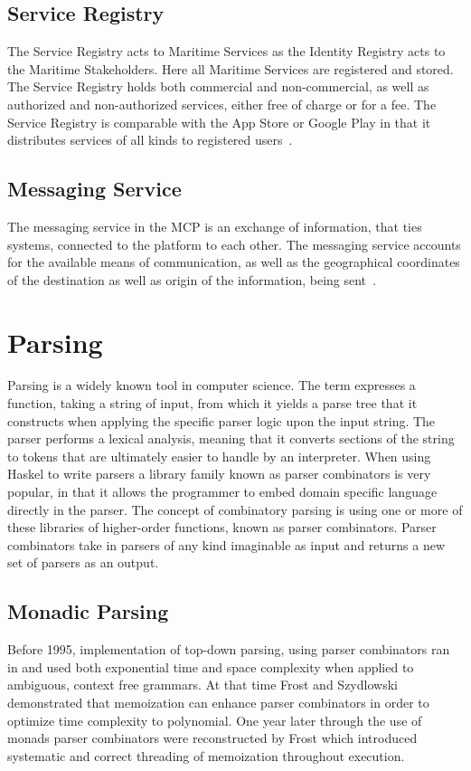 \subsection{Service Registry}
The Service Registry acts to Maritime Services as the Identity Registry acts to the Maritime Stakeholders. Here all Maritime Services are registered and stored. The Service Registry holds both commercial and non-commercial, as well as authorized and non-authorized services, either free of charge or for a fee. The Service Registry is comparable with the App Store or Google Play in that it distributes services of all kinds to registered users~\cite{efficienSea2}.
\subsection{Messaging Service}
The messaging service in the MCP is an exchange of information, that ties systems, connected to the platform to each other. The messaging service accounts for the available means of communication, as well as the geographical coordinates of the destination as well as origin of the information, being sent~\cite{efficienSea2}.

\section{Parsing}
Parsing is a widely known tool in computer science. The term expresses a function, taking a string of input, from which it yields a parse tree that it constructs when applying the specific parser logic upon the input string. The parser performs a lexical analysis, meaning that it converts sections of the string to tokens that are ultimately easier to handle by an interpreter. When using Haskel to write parsers a library family known as parser combinators is very popular, in that it allows the programmer to embed domain specific language directly in the parser. The concept of combinatory parsing is using one or more of these libraries of higher-order functions, known as parser combinators. Parser combinators take in parsers of any kind imaginable as input and returns a new set of parsers as an output.

\subsection{Monadic Parsing}
Before 1995, implementation of top-down parsing, using parser combinators ran in and used both exponential time and space complexity when applied to ambiguous, context free grammars. At that time Frost and Szydlowski demonstrated that memoization can enhance parser combinators in order to optimize time complexity to polynomial\cite{memoization}. One year later through the use of monads parser combinators were reconstructed by Frost which introduced systematic and correct threading of memoization throughout execution.

